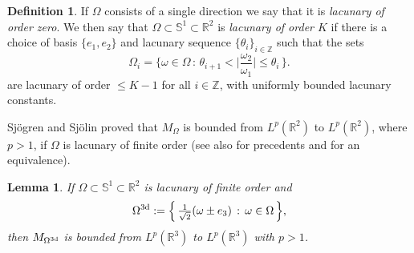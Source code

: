 \documentclass[11pt]{amsart}
\newtheorem{lemma}[theorem]{Lemma}
\theoremstyle{definition}
\newtheorem{defn}[theorem]{Definition}
\theoremstyle{remark}
\begin{document}
\begin{defn}\label{dfour} If $\Omega$ consists of a
single direction we say that it is {\it lacunary of order zero}. We then say that $\Omega\subset \mathbb{S}^1\subset\mathbb{R}^2$ is {\it lacunary of order $K$} if there is a choice of basis $\{e_1,e_2\}$ and lacunary sequence $\{\theta_i\}_{i\in \mathbb{Z}}$ such that the sets
$$
\Omega_i=\Big\{ \omega \in \Omega\, :\, \theta_{i+1}<
\Big|\frac{\omega_2}{\omega_1}\Big|{\leqslant} \theta_i\,\Big\}.
$$
are lacunary of order ${\leqslant} K-1$ for all $i\in \mathbb{Z}$, with
uniformly bounded lacunary constants.
\end{defn}

 Sj\"ogren and
Sj\"olin \cite{SS} proved that $M_{\Omega}$ is bounded from
$L^p(\mathbb{R}^2)$ to $L^p(\mathbb{R}^2)$, where $p>1$, if $\Omega$ is lacunary of
finite order (see also \cite{CRF2,NSW} for precedents and \cite{B}
for an equivalence).

\begin{lemma}\label{pwq} If $\Omega\subset \mathbb{S}^1\subset \mathbb{R}^2$ is lacunary of finite order and
$$
\Omega^{\rm 3d}:=\Big\{ \,\tfrac{1}{\sqrt{2}}(\omega\pm e_3)\, :\, \omega\in\Omega\,\Big\},
$$
then $M_{\Omega^{\rm 3d}}$ is bounded from $L^p(\mathbb{R}^3)$ to $L^p(\mathbb{R}^3)$ with $p>1$.
\end{lemma}
\end{document}
